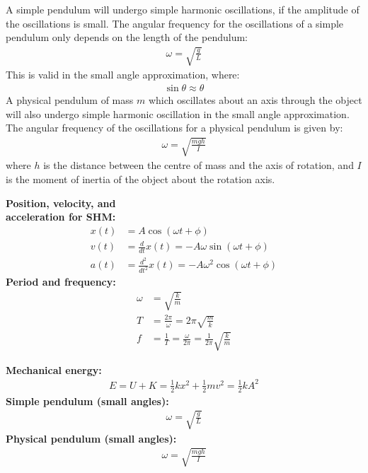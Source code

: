 \begin{chapterSummary}
A simple pendulum will undergo simple harmonic oscillations, if the amplitude of the oscillations is small. The angular frequency for the oscillations of a simple pendulum only depends on the length of the pendulum:
\begin{align*}
\omega = \sqrt{\frac{g}{L}}
\end{align*}
This is valid in the small angle approximation, where:
\begin{align*}
\sin\theta \approx \theta
\end{align*}
A physical pendulum of mass $m$ which oscillates about an axis through the object will also undergo simple harmonic oscillation in the small angle approximation. The angular frequency of the oscillations for a physical pendulum is given by:
\begin{align*}
\omega = \sqrt{\frac{mgh}{I}}
\end{align*}
where $h$ is the distance between the centre of mass and the axis of rotation, and $I$ is the moment of inertia of the object about the rotation axis.
\end{chapterSummary}

\newpage
\begin{importantEquations}
\begin{multicols}{2}
\textbf{Position, velocity, and \\acceleration for SHM:}
\begin{align*}
x(t)&= A \cos(\omega t + \phi)\\
v(t)&=\frac{d}{dt}x(t) = -A\omega\sin(\omega t + \phi)\\
a(t)&= \frac{d^2}{dt^2}x(t) = -A\omega^2\cos(\omega t + \phi)
\end{align*}
\textbf{Period and frequency:}
\begin{align*}
\omega &= \sqrt{\frac{k}{m}}\\
T&=\frac{2\pi}{\omega}=2\pi\sqrt{\frac{m}{k}}\\
f&=\frac{1}{T}=\frac{\omega}{2\pi}=\frac{1}{2\pi}\sqrt{\frac{k}{m}}
\end{align*}
\columnbreak

\textbf{Mechanical energy:}
\begin{align*}
E =U+K=\frac{1}{2}kx^2+\frac{1}{2}mv^2= \frac{1}{2}kA^2
\end{align*}
\textbf{Simple pendulum (small angles):}
\begin{align*}
\omega = \sqrt{\frac{g}{L}}
\end{align*}
\textbf{Physical pendulum (small angles):}
\begin{align*}
\omega = \sqrt{\frac{mgh}{I}}
\end{align*}
\end{multicols}
\end{importantEquations}

